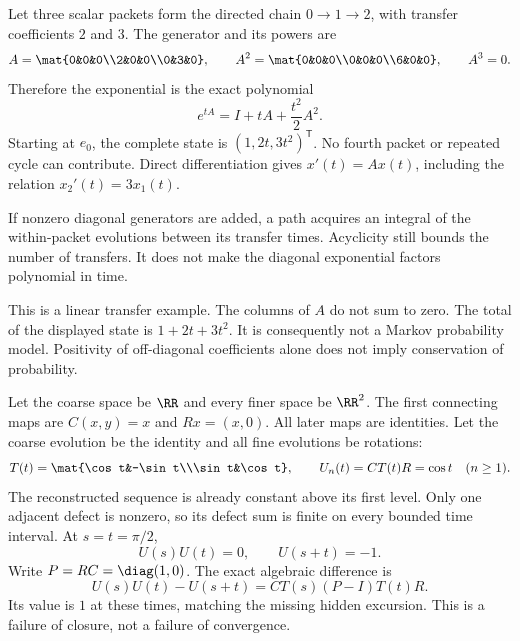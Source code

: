Let three scalar packets form the directed chain $0\to1\to2$, with transfer coefficients $2$ and $3$. The generator and its powers are
\[
A=\mat{0&0&0\\2&0&0\\0&3&0},\qquad
A^2=\mat{0&0&0\\0&0&0\\6&0&0},\qquad A^3=0.
\]
Therefore the exponential is the exact polynomial
\[
e^{tA}=I+tA+\frac{t^2}{2}A^2.
\]
Starting at $e_0$, the complete state is $(1,2t,3t^2)^{\mathsf T}$. No fourth packet or repeated cycle can contribute. Direct differentiation gives $x'(t)=Ax(t)$, including the relation $x_2'(t)=3x_1(t)$.

If nonzero diagonal generators are added, a path acquires an integral of the within-packet evolutions between its transfer times. Acyclicity still bounds the number of transfers. It does not make the diagonal exponential factors polynomial in time.

This is a linear transfer example. The columns of $A$ do not sum to zero. The total of the displayed state is $1+2t+3t^2$. It is consequently not a Markov probability model. Positivity of off-diagonal coefficients alone does not imply conservation of probability.

Let the coarse space be $\RR$ and every finer space be $\RR^2$. The first connecting maps are $C(x,y)=x$ and $Rx=(x,0)$. All later maps are identities. Let the coarse evolution be the identity and all fine evolutions be rotations:
\[
T(t)=\mat{\cos t&-\sin t\\\sin t&\cos t},\qquad
U_n(t)=CT(t)R=\cos t\quad(n\ge1).
\]
The reconstructed sequence is already constant above its first level. Only one adjacent defect is nonzero, so its defect sum is finite on every bounded time interval.
At $s=t=\pi/2$,
\[
U(s)U(t)=0,\qquad U(s+t)=-1.
\]
Write $P=RC=\diag(1,0)$. The exact algebraic difference is
\[
U(s)U(t)-U(s+t)=CT(s)(P-I)T(t)R.
\]
Its value is $1$ at these times, matching the missing hidden excursion. This is a failure of closure, not a failure of convergence.

